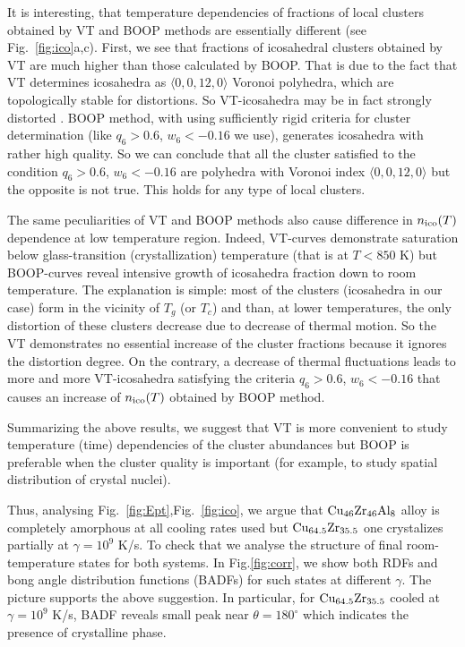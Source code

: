 \documentclass[jcp,twocolumn,superscriptaddress,floatfix,graphicx,showpacs]{revtex4-1}
\begin{document}
It is interesting, that temperature dependencies of fractions of local clusters obtained by VT and BOOP methods are essentially different (see Fig.~\ref{fig:ico}a,c). First, we see that fractions of icosahedral clusters obtained by VT are much higher than those calculated by BOOP. That is due to the fact that VT determines icosahedra as  $\langle 0, 0, 12, 0 \rangle$ Voronoi polyhedra, which are topologically stable for distortions. So VT-icosahedra may be in fact strongly distorted \cite{Klumov2016JETPLett}. BOOP method, with using sufficiently rigid criteria for cluster determination (like  $q_6 > 0.6$, $w_6 < -0.16$ we use), generates icosahedra with rather high quality. So we can conclude that all the cluster satisfied to the condition  $q_6 > 0.6$, $w_6 < -0.16$ are polyhedra with Voronoi index $\langle 0, 0, 12, 0 \rangle$ but the opposite is not true. This holds for any type of local clusters.

The same peculiarities of VT and BOOP methods also cause difference in $n_{\rm ico}(T)$ dependence at low temperature region. Indeed, VT-curves demonstrate saturation below glass-transition (crystallization) temperature (that is at $T< 850$ K)
 but BOOP-curves reveal intensive growth of icosahedra fraction down to room temperature. The explanation is simple: most of the clusters (icosahedra in our case) form in the vicinity of $T_g$ (or $T_c$) and than, at lower temperatures, the only distortion of these clusters decrease due to decrease of thermal motion. So the VT demonstrates no essential increase of the cluster fractions because it ignores the distortion degree. On the contrary, a decrease of thermal fluctuations leads to more and more VT-icosahedra satisfying the criteria $q_6 > 0.6$, $w_6 < -0.16$ that causes an increase of $n_{\rm ico}(T)$ obtained by BOOP method.

Summarizing the above results, we suggest that VT is more convenient to study temperature (time) dependencies of the cluster abundances but BOOP is preferable when the cluster quality is important (for example, to study spatial distribution of crystal nuclei).

Thus, analysing Fig.~\ref{fig:Ept},Fig.~\ref{fig:ico}, we argue that ${\rm Cu_{46}Zr_{46}Al_{8}}$ alloy is completely amorphous at all cooling rates used  but ${\rm Cu_{64.5}Zr_{35.5}}$ one crystalizes partially at $\gamma = 10^{9}$ K/s.  To check that we analyse the structure of final room-temperature states for both systems. In Fig.\ref{fig:corr}, we show both RDFs and bong angle distribution functions (BADFs) for such states at different $\gamma$. The picture supports the above suggestion. In particular, for ${\rm Cu_{64.5}Zr_{35.5}}$ cooled at $\gamma=10^9$ K/s,  BADF reveals small peak near $\theta=180^{\circ}$ which indicates the presence of crystalline phase.
\end{document}
